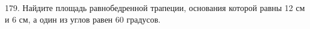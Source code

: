 179. Найдите площадь равнобедренной трапеции, основания которой равны 12 см и 6 см, а один из углов равен 60 градусов.\\
